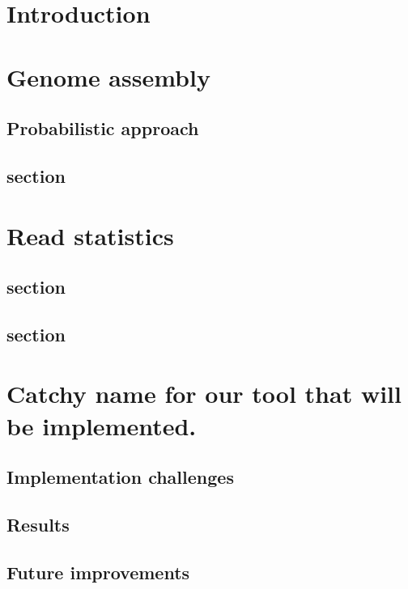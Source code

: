 \chapter*{Introduction}


\chapter{Genome assembly}
\section{Probabilistic approach}
\section{section}

\chapter{Read statistics}
\section{section}
\section{section}



\chapter{Catchy name for our tool that will be implemented.}
	\section{Implementation challenges}
	\section{Results}
	\section{Future improvements}





